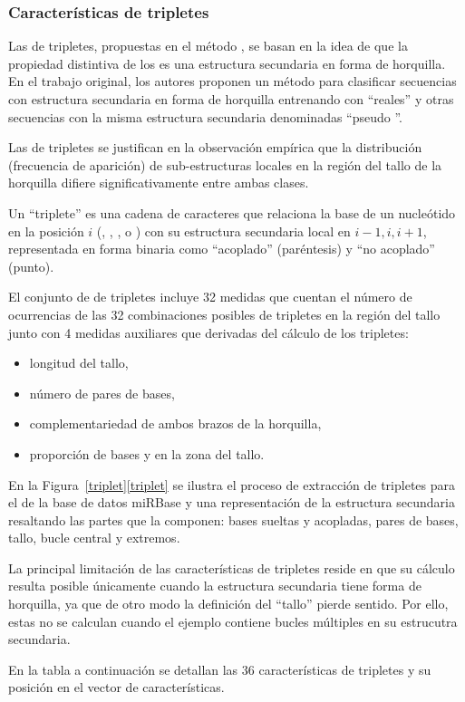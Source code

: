%
%
\subsubsection{Características de tripletes}
%
Las  de tripletes, propuestas en el método 
\cite{xue}, se basan en la idea de que la propiedad distintiva de los
 es una estructura secundaria en forma de horquilla.  En
el trabajo original, los autores proponen un método para clasificar
secuencias con estructura secundaria en forma de horquilla entrenando
con  ``reales'' y otras secuencias con la misma estructura
secundaria denominadas ``pseudo ''.

Las  de tripletes se justifican en la observación empírica
que la distribución (frecuencia de aparición) de sub-estructuras
locales en la región del tallo de la horquilla difiere
significativamente entre ambas clases.


Un ``triplete'' es una cadena de caracteres que relaciona la base de
un nucleótido en la posición $i$ (\ntA, \ntC, \ntG, o \ntU) con su
estructura secundaria local en $i-1,i,i+1$, representada en forma
binaria como ``acoplado'' \pairL (paréntesis) y ``no acoplado''
\noPair (punto).

El conjunto de  de tripletes incluye 32 medidas que cuentan
el número de ocurrencias de las 32 combinaciones posibles de tripletes
en la región del tallo junto con 4 medidas auxiliares que derivadas
del cálculo de los tripletes:
%
\begin{itemize}
\item longitud del tallo,
\item número de pares de bases,
\item complementariedad de ambos brazos de la horquilla,
\item proporción de bases \ntG y \ntC en la zona del tallo.
\end{itemize}
%

En la \iflatexml{}Figura~\ref{triplet}\else\autoref{triplet}\fi{} se
ilustra el proceso de extracción de tripletes para el \premirna{}
 de la base de datos miRBase \cite{mirbase} y una
representación de la estructura secundaria resaltando las partes que
la componen: bases sueltas y acopladas, pares de bases, tallo, bucle
central y extremos.

La principal limitación de las características de tripletes reside en
que su cálculo resulta posible únicamente cuando la estructura
secundaria tiene forma de horquilla, ya que de otro modo la definición
del ``tallo'' pierde sentido.  Por ello, estas  no se
calculan cuando el ejemplo contiene bucles múltiples en su estrucutra
secundaria.

En la tabla a continuación se detallan las 36 características de
tripletes y su posición en el vector de características.

